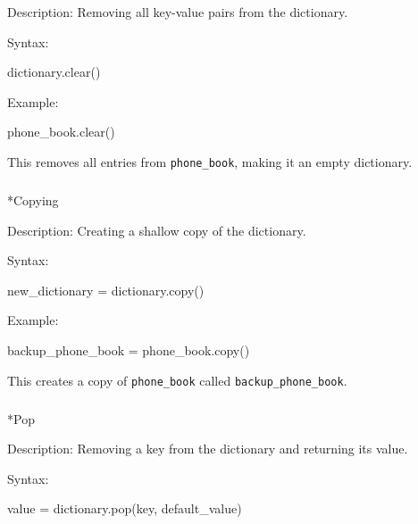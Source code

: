 \documentclass[
  letterpaper,
  DIV=11,
  numbers=noendperiod]{scrreprt}
\makeatletter
\let\oldsubparagraph\subparagraph
\renewcommand{\subparagraph}{
    \@ifstar
      \xxxSubParagraphStar
      \xxxSubParagraphNoStar
  }
\newcommand{\xxxSubParagraphStar}[1]{\oldsubparagraph*{#1}\mbox{}}
\newcommand{\xxxSubParagraphNoStar}[1]{\oldsubparagraph{#1}\mbox{}}
\newenvironment{Shaded}{\begin{snugshade}}{\end{snugshade}}
\newcommand{\NormalTok}[1]{\textcolor[rgb]{0.00,0.23,0.31}{#1}}
\makeatother
\begin{document}
Description: Removing all key-value pairs from the dictionary.

Syntax:

\begin{Shaded}
\begin{Highlighting}[]
\NormalTok{dictionary.clear()}
\end{Highlighting}
\end{Shaded}

Example:

\begin{Shaded}
\begin{Highlighting}[]
\NormalTok{phone\_book.clear()}
\end{Highlighting}
\end{Shaded}

This removes all entries from \texttt{phone\_book}, making it an empty
dictionary.

\subparagraph*{Copying}\label{copying}

Description: Creating a shallow copy of the dictionary.

Syntax:

\begin{Shaded}
\begin{Highlighting}[]
\NormalTok{new\_dictionary = dictionary.copy()}
\end{Highlighting}
\end{Shaded}

Example:

\begin{Shaded}
\begin{Highlighting}[]
\NormalTok{backup\_phone\_book = phone\_book.copy()}
\end{Highlighting}
\end{Shaded}

This creates a copy of \texttt{phone\_book} called
\texttt{backup\_phone\_book}.

\subparagraph*{Pop}\label{pop}

Description: Removing a key from the dictionary and returning its value.

Syntax:

\begin{Shaded}
\begin{Highlighting}[]
\NormalTok{value = dictionary.pop(key, default\_value)}
\end{Highlighting}
\end{Shaded}
\end{document}
